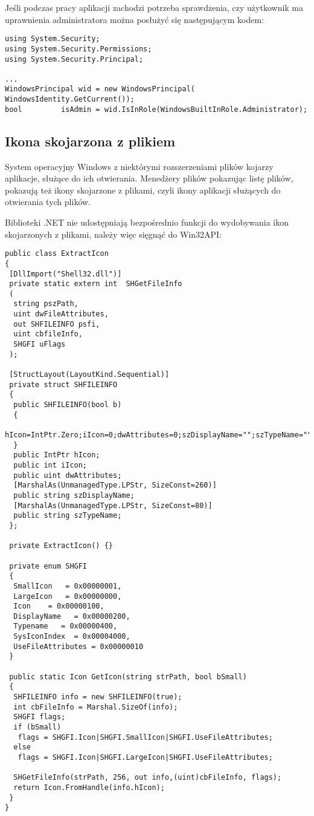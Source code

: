 Jeśli podczas pracy aplikacji zachodzi potrzeba sprawdzenia, czy użytkownik ma uprawnienia
administratora można posłużyć się następującym kodem:

\begin{scriptsize}
\begin{verbatim}
using System.Security;
using System.Security.Permissions;
using System.Security.Principal;

...
WindowsPrincipal wid = new WindowsPrincipal( WindowsIdentity.GetCurrent());
bool         isAdmin = wid.IsInRole(WindowsBuiltInRole.Administrator);		
\end{verbatim}
\end{scriptsize}

\subsection{Ikona skojarzona z plikiem}

System operacyjny Windows z niektórymi rozszerzeniami plików kojarzy aplikacje, służące do ich
otwierania. Menedżery plików pokazując listę plików, pokazują też ikony skojarzone z plikami, czyli
ikony aplikacji służących do otwierania tych plików.

Biblioteki .NET nie udostępniają bezpośrednio funkcji do wydobywania ikon skojarzonych z plikami,
należy więc sięgnąć do Win32API:

\begin{scriptsize}
\begin{verbatim}
public class ExtractIcon
{
 [DllImport("Shell32.dll")]
 private static extern int  SHGetFileInfo
 (
  string pszPath,
  uint dwFileAttributes,
  out SHFILEINFO psfi,
  uint cbfileInfo,
  SHGFI uFlags
 );

 [StructLayout(LayoutKind.Sequential)]
 private struct SHFILEINFO
 {
  public SHFILEINFO(bool b)
  {
   hIcon=IntPtr.Zero;iIcon=0;dwAttributes=0;szDisplayName="";szTypeName="";
  }
  public IntPtr hIcon;
  public int iIcon;
  public uint dwAttributes;
  [MarshalAs(UnmanagedType.LPStr, SizeConst=260)]
  public string szDisplayName;
  [MarshalAs(UnmanagedType.LPStr, SizeConst=80)]
  public string szTypeName;
 };

 private ExtractIcon() {}

 private enum SHGFI
 {
  SmallIcon   = 0x00000001,
  LargeIcon   = 0x00000000,
  Icon    = 0x00000100,
  DisplayName   = 0x00000200,
  Typename   = 0x00000400,
  SysIconIndex  = 0x00004000,
  UseFileAttributes = 0x00000010
 }

 public static Icon GetIcon(string strPath, bool bSmall)
 {
  SHFILEINFO info = new SHFILEINFO(true);
  int cbFileInfo = Marshal.SizeOf(info);
  SHGFI flags;
  if (bSmall)
   flags = SHGFI.Icon|SHGFI.SmallIcon|SHGFI.UseFileAttributes;
  else
   flags = SHGFI.Icon|SHGFI.LargeIcon|SHGFI.UseFileAttributes;

  SHGetFileInfo(strPath, 256, out info,(uint)cbFileInfo, flags);
  return Icon.FromHandle(info.hIcon);
 }
}
\end{verbatim}
\end{scriptsize}

